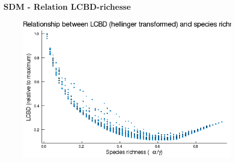 \documentclass[10pt]{beamer}
\begin{document}
\begin{frame}
  \frametitle{SDM - Relation LCBD-richesse}
  \begin{figure}
    \centering
    \includegraphics[scale=0.4]{fig/sdm-relation-lcbd-richness-transf.png}
  \end{figure}
\end{frame}
\end{document}
